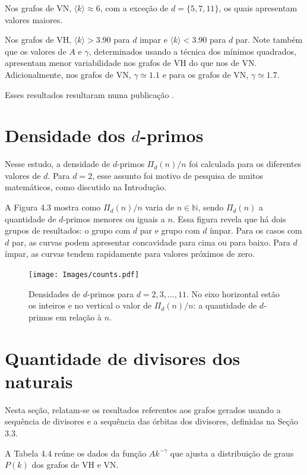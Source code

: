 \documentclass[12pt,a4paper,fleqn]{report}
\begin{document}
Nos grafos de VN, $\langle k \rangle
\approx 6$, com a exceção de $d=\{5,7,11\}$, os quais apresentam valores
maiores. 

Nos grafos de VH, $\langle k \rangle > 3.90$ para $d$
impar e $\langle k \rangle < 3.90$ para $d$ par. Note também que os
valores de $A$ e $\gamma$, determinados usando a técnica dos mínimos
quadrados, apresentam menor variabilidade nos grafos de VH
do que nos de VN. Adicionalmente, nos grafos de VN, $\gamma \simeq 1.1$ e
para os grafos de VN, $\gamma \simeq 1.7$.

Esses resultados resultaram numa publicação \cite{me_2020}.


\section{Densidade dos $d$-primos}

Nesse estudo, a densidade de $d$-primos $\Pi_d(n)/n$ foi calculada para
os diferentes valores de $d$. Para $d=2$, esse assunto foi motivo de pesquisa de muitos matemáticos, como discutido na Introdução.


A Figura 4.3 mostra como $\Pi_d(n)/n$ varia de $n \in \mathbb{N}$, sendo $\Pi_d(n)$ a quantidade de $d$-primos menores ou iguais a $n$. Essa figura revela que há
dois grupos de resultados: o grupo com $d$ par e grupo com $d$ ímpar.
Para os casos com $d$ par, as curvas podem apresentar concavidade para cima
ou para baixo. Para $d$ ímpar, as curvas tendem rapidamente para valores próximos de zero.


\begin{figure}[H]
    \centering
    \texttt{[image: Images/counts.pdf]}
    \caption{Densidades de $d$-primos para $d=2,3,\ldots, 11$. No eixo horizontal
    estão os inteiros e no vertical o valor de $\Pi_d(n)/n$: a quantidade
    de $d$-primos em relação à $n$.}
    \label{graph-counts}
\end{figure}

\section{Quantidade de divisores dos naturais}

Nesta seção, relatam-se os resultados referentes aos grafos
gerados usando a sequência de divisores e a sequência das órbitas dos divisores, definidas na Seção 3.3.

A Tabela 4.4 reúne os dados da função $Ak^{-\gamma}$ que ajusta a distribuição de graus $P(k)$ dos grafos de VH e VN.
\end{document}

